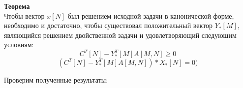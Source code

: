 \documentclass[../body.tex]{subfiles}
\begin{document}
	\textbf{Теорема}\\
	Чтобы вектор $x[N]$ был решением исходной задачи в канонической форме, необходимо и достаточно, чтобы существовал положительный вектор $Y_{*}[M]$, являющийся решением двойственной задачи и удовлетворяющий следующим условиям:
	$$C^{T}[N]-Y^{T}_{*}[M]A[M,N]\ge 0$$
	$$(C^{T}[N]-Y^{T}_{*}[M]A[M,N])*X_{*}[N] = 0)$$
	
	Проверим полученные результаты:
	
\end{document}
